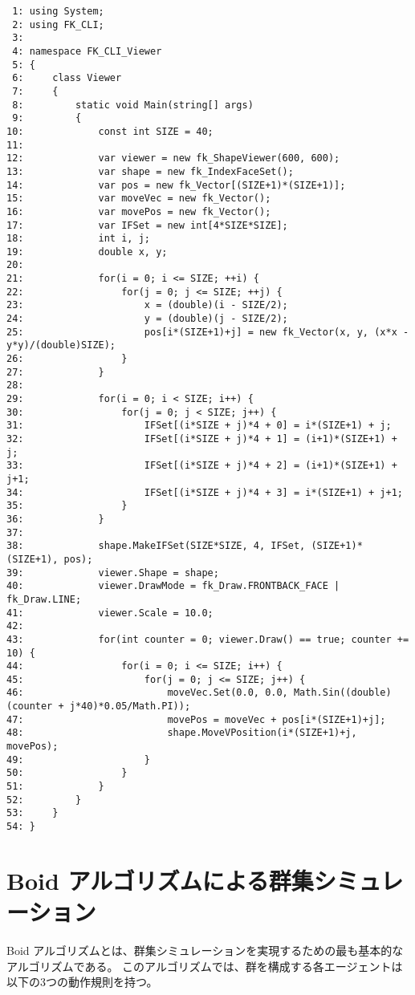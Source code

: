 \begin{breakbox}
\begin{small}
\begin{verbatim}
 1: using System;
 2: using FK_CLI;
 3: 
 4: namespace FK_CLI_Viewer
 5: {
 6:     class Viewer
 7:     {
 8:         static void Main(string[] args)
 9:         {
10:             const int SIZE = 40;
11: 
12:             var viewer = new fk_ShapeViewer(600, 600);
13:             var shape = new fk_IndexFaceSet();
14:             var pos = new fk_Vector[(SIZE+1)*(SIZE+1)];
15:             var moveVec = new fk_Vector();
16:             var movePos = new fk_Vector();
17:             var IFSet = new int[4*SIZE*SIZE];
18:             int i, j;
19:             double x, y;
20: 
21:             for(i = 0; i <= SIZE; ++i) {
22:                 for(j = 0; j <= SIZE; ++j) {
23:                     x = (double)(i - SIZE/2);
24:                     y = (double)(j - SIZE/2);
25:                     pos[i*(SIZE+1)+j] = new fk_Vector(x, y, (x*x - y*y)/(double)SIZE);
26:                 }
27:             }
28: 
29:             for(i = 0; i < SIZE; i++) {
30:                 for(j = 0; j < SIZE; j++) {
31:                     IFSet[(i*SIZE + j)*4 + 0] = i*(SIZE+1) + j;
32:                     IFSet[(i*SIZE + j)*4 + 1] = (i+1)*(SIZE+1) + j;
33:                     IFSet[(i*SIZE + j)*4 + 2] = (i+1)*(SIZE+1) + j+1;
34:                     IFSet[(i*SIZE + j)*4 + 3] = i*(SIZE+1) + j+1;
35:                 }
36:             }
37: 
38:             shape.MakeIFSet(SIZE*SIZE, 4, IFSet, (SIZE+1)*(SIZE+1), pos);
39:             viewer.Shape = shape;
40:             viewer.DrawMode = fk_Draw.FRONTBACK_FACE | fk_Draw.LINE;
41:             viewer.Scale = 10.0;
42: 
43:             for(int counter = 0; viewer.Draw() == true; counter += 10) {
44:                 for(i = 0; i <= SIZE; i++) {
45:                     for(j = 0; j <= SIZE; j++) {
46:                         moveVec.Set(0.0, 0.0, Math.Sin((double)(counter + j*40)*0.05/Math.PI));
47:                         movePos = moveVec + pos[i*(SIZE+1)+j];
48:                         shape.MoveVPosition(i*(SIZE+1)+j, movePos);
49:                     }
50:                 }
51:             }
52:         }
53:     }
54: }
\end{verbatim}
\end{small}
\end{breakbox}

\section{Boid アルゴリズムによる群集シミュレーション}
Boid アルゴリズムとは、群集シミュレーションを実現するための最も基本的なアルゴリズムである。
このアルゴリズムでは、群を構成する各エージェントは以下の3つの動作規則を持つ。

